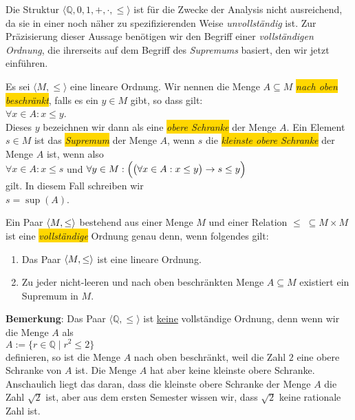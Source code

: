 Die Struktur $\langle \mathbb{Q}, 0, 1, +, \cdot, \leq \rangle$ ist  f\"ur die Zwecke der Analysis nicht ausreichend,
da sie in einer noch n\"aher zu spezifizierenden Weise \emph{unvollst\"andig} ist.  Zur Pr\"azisierung dieser Aussage
ben\"otigen wir den Begriff einer \emph{vollst\"andigen Ordnung}, die ihrerseits
auf dem Begriff des \emph{Supremums} basiert, den wir jetzt einf\"uhren.


\begin{Definition}[Supremum]
Es sei $\langle M, \leq \rangle$ eine lineare Ordnung.
Wir nennen die Menge $A \subseteq M$  \linebreak
\colorbox{gold}{\emph{nach oben beschr\"ankt}}, falls es ein
 $y \in M$ gibt, so dass gilt:
\\[0.2cm]
\hspace*{1.3cm}
$\forall x \in A:  x \leq y$.
\\[0.2cm]
Dieses $y$ bezeichnen wir dann als eine \colorbox{gold}{\emph{obere Schranke}} der Menge $A$.
Ein Element $s \in M$ ist das \colorbox{gold}{\emph{Supremum}} der Menge $A$, wenn $s$ die 
\colorbox{gold}{\emph{kleinste obere Schranke}} der Menge $A$ ist, wenn also 
\\[0.2cm]
\hspace*{1.3cm}
$\forall x \in A: x \leq s$ \quad \mbox{und} \quad
$\forall y \in M: \Bigl(\bigl(\forall x \in A: x \leq y \bigr)\rightarrow s \leq y \Bigr)$
\\[0.2cm]
gilt.  In diesem Fall schreiben wir
\\[0.2cm]
\hspace*{1.3cm}
$s = \sup(A)$.
\edx
\end{Definition}

\begin{Definition}
  Ein Paar $\pair(M, \leq)$ bestehend aus einer Menge $M$ und einer Relation $\leq\; \subseteq M \times M$ 
  ist eine \colorbox{gold}{\emph{vollst\"andige}} Ordnung genau denn, wenn folgendes gilt:
  \begin{enumerate}
  \item Das Paar $\pair(M, \leq)$ ist eine lineare Ordnung.
  \item Zu jeder nicht-leeren und nach oben beschr\"ankten Menge $A \subseteq M$ existiert ein
        Supremum in $M$. \edx
  \end{enumerate}
\end{Definition}
\vspace*{-0.2cm}


\noindent
\textbf{Bemerkung}:
Das Paar $\langle \mathbb{Q}, \leq \rangle$ ist \underline{keine} vollst\"andige Ordnung, denn wenn wir die Menge
$A$ als
\\[0.2cm]
\hspace*{1.3cm}
$A := \{ r \in \mathbb{Q} \mid r^2 \leq 2 \}$
\\[0.2cm]
definieren, so ist die Menge $A$ nach oben beschr\"ankt, weil die Zahl $2$ eine obere
Schranke von $A$ ist.  Die Menge $A$ hat aber keine kleinste obere Schranke.  Anschaulich liegt das
daran, dass die kleinste obere Schranke  der Menge $A$ die Zahl $\sqrt{2}$ ist, aber aus dem ersten
Semester wissen wir, dass $\sqrt{2}$ keine rationale Zahl ist.  \eox


